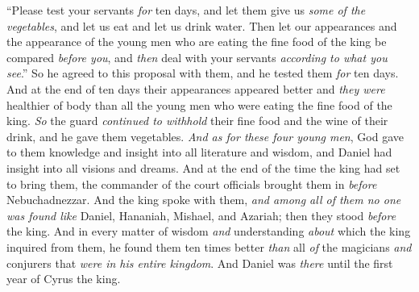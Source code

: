 \begin{biblechapter}
\verse “Please test your servants \textit{for} ten days, and let them give us \textit{some of the vegetables}, and let us eat and let us drink water.
\verse Then let our appearances and the appearance of the young men who are eating the fine food of the king be compared \textit{before you}, and \textit{then} deal with your servants \textit{according to what you see}.”
\verse So he agreed to this proposal with them, and he tested them \textit{for} ten days.
\verse And at the end of ten days their appearances appeared better and \textit{they were} healthier of body than all the young men who were eating the fine food of the king.
\verse \textit{So} the guard \textit{continued to withhold} their fine food and the wine of their drink, and he gave them vegetables.
\verse \textit{And as for these four young men}, God gave to them knowledge and insight into all literature and wisdom, and Daniel had insight into all visions and dreams.
\verse And at the end of the time the king had set to bring them, the commander of the court officials brought them in \textit{before} Nebuchadnezzar.
\verse And the king spoke with them, \textit{and among all of them no one was found like} Daniel, Hananiah, Mishael, and Azariah; then they stood \textit{before} the king.
\verse And in every matter of wisdom \textit{and} understanding \textit{about} which the king inquired from them, he found them ten times better \textit{than} all \textit{of} the magicians \textit{and} conjurers that \textit{were in his entire kingdom}.
\verse And Daniel was \textit{there} until the first year of Cyrus the king.
\end{biblechapter}


